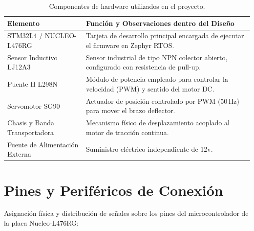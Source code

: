\documentclass[12pt, letterpaper]{article}
\begin{document}
\begin{table}[H]
\centering
\renewcommand{\arraystretch}{1.2}
\caption{Componentes de hardware utilizados en el proyecto.}
\label{tab:hardware_materiales}
\vspace{0.3cm}
\begin{tabularx}{\textwidth}{lX}
\toprule
\textbf{Elemento} & \textbf{Función y Observaciones dentro del Diseño} \\
\midrule
STM32L4 / NUCLEO-L476RG & Tarjeta de desarrollo principal encargada de ejecutar el firmware en Zephyr RTOS. \\
\midrule
Sensor Inductivo LJ12A3 & Sensor industrial de tipo NPN colector abierto, configurado con resistencia de pull-up. \\
\midrule
Puente H L298N & Módulo de potencia empleado para controlar la velocidad (PWM) y sentido del motor DC. \\
\midrule
Servomotor SG90 & Actuador de posición controlado por PWM (50\,Hz) para mover el brazo deflector. \\
\midrule
Chasis y Banda Transportadora & Mecanismo físico de desplazamiento acoplado al motor de tracción continua. \\
\midrule
Fuente de Alimentación Externa & Suministro eléctrico independiente de 12v. \\
\bottomrule
\end{tabularx}
\end{table}

\clearpage

\section{Pines y Periféricos de Conexión}
\label{sec:pines_perifericos_tentativos}

Asignación física y distribución de señales sobre los pines del microcontrolador de la placa Nucleo-L476RG:

\vspace{0.3cm}
\end{document}
